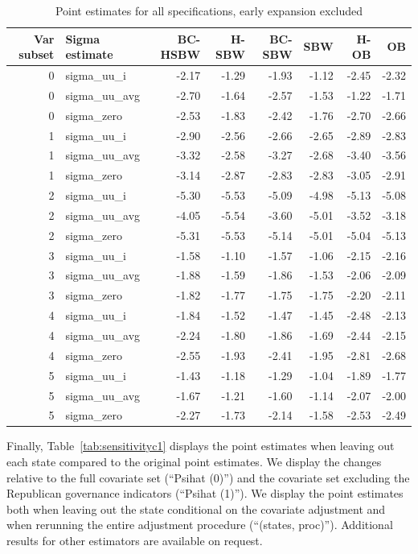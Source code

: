 \documentclass[12pt]{article}
\begin{document}
\begin{table}[ht]
\begin{tabular}{rlrrrrrr}
  \toprule
Var subset & Sigma estimate & BC-HSBW & H-SBW & BC-SBW & SBW & H-OB & OB \\ 
  \midrule
0 & sigma\_uu\_i & -2.17 & -1.29 & -1.93 & -1.12 & -2.45 & -2.32 \\ 
  0 & sigma\_uu\_avg & -2.70 & -1.64 & -2.57 & -1.53 & -1.22 & -1.71 \\ 
  0 & sigma\_zero & -2.53 & -1.83 & -2.42 & -1.76 & -2.70 & -2.66 \\ 
  1 & sigma\_uu\_i & -2.90 & -2.56 & -2.66 & -2.65 & -2.89 & -2.83 \\ 
  1 & sigma\_uu\_avg & -3.32 & -2.58 & -3.27 & -2.68 & -3.40 & -3.56 \\ 
  1 & sigma\_zero & -3.14 & -2.87 & -2.83 & -2.83 & -3.05 & -2.91 \\ 
  2 & sigma\_uu\_i & -5.30 & -5.53 & -5.09 & -4.98 & -5.13 & -5.08 \\ 
  2 & sigma\_uu\_avg & -4.05 & -5.54 & -3.60 & -5.01 & -3.52 & -3.18 \\ 
  2 & sigma\_zero & -5.31 & -5.53 & -5.14 & -5.01 & -5.04 & -5.13 \\ 
  3 & sigma\_uu\_i & -1.58 & -1.10 & -1.57 & -1.06 & -2.15 & -2.16 \\ 
  3 & sigma\_uu\_avg & -1.88 & -1.59 & -1.86 & -1.53 & -2.06 & -2.09 \\ 
  3 & sigma\_zero & -1.82 & -1.77 & -1.75 & -1.75 & -2.20 & -2.11 \\ 
  4 & sigma\_uu\_i & -1.84 & -1.52 & -1.47 & -1.45 & -2.48 & -2.13 \\ 
  4 & sigma\_uu\_avg & -2.24 & -1.80 & -1.86 & -1.69 & -2.44 & -2.15 \\ 
  4 & sigma\_zero & -2.55 & -1.93 & -2.41 & -1.95 & -2.81 & -2.68 \\ 
  5 & sigma\_uu\_i & -1.43 & -1.18 & -1.29 & -1.04 & -1.89 & -1.77 \\ 
  5 & sigma\_uu\_avg & -1.67 & -1.21 & -1.60 & -1.14 & -2.07 & -2.00 \\ 
  5 & sigma\_zero & -2.27 & -1.73 & -2.14 & -1.58 & -2.53 & -2.49 \\ 
   \bottomrule
\end{tabular}
   \caption{Point estimates for all specifications, early expansion excluded}
    \label{tab:secondaryptests}
\end{table}

Finally, Table~\ref{tab:sensitivityc1} displays the point estimates when leaving out each state compared to the original point estimates. We display the changes relative to the full covariate set (``Psihat (0)'') and the covariate set excluding the Republican governance indicators (``Psihat (1)''). We display the point estimates both when leaving out the state conditional on the covariate adjustment and when rerunning the entire adjustment procedure (``(states, proc)''). Additional results for other estimators are available on request.
\end{document}
